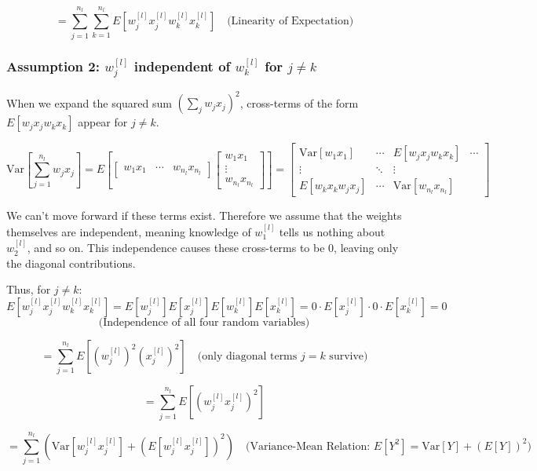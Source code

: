 \documentclass[
  letterpaper,
  DIV=11,
  numbers=noendperiod]{scrartcl}
\begin{document}
\[= \sum_{j=1}^{n_l}\sum_{k=1}^{n_l} E[w_j^{[l]} x_j^{[l]} w_k^{[l]} x_k^{[l]}] \quad \text{(Linearity of Expectation)}\]

\subsubsection{\texorpdfstring{Assumption 2: \(w_j^{[l]}\) independent
of \(w_k^{[l]}\) for
\(j \neq k\)}{Assumption 2: w\_j\^{}\{{[}l{]}\} independent of w\_k\^{}\{{[}l{]}\} for j \textbackslash neq k}}\label{assumption-2-w_jl-independent-of-w_kl-for-j-neq-k}

When we expand the squared sum \((\sum_j w_j x_j)^2\), cross-terms of
the form \(E[w_j x_j w_k x_k]\) appear for \(j \neq k\).

\[
\text{Var}\!\left[\sum_{j=1}^{n_l} w_j x_j \right]
= 
E\!\left[
\begin{bmatrix}
w_1 x_1 & \cdots & w_{n_l} x_{n_l}
\end{bmatrix}
\begin{bmatrix}
w_1 x_1 \\ \vdots \\ w_{n_l} x_{n_l}
\end{bmatrix}
\right]
=
\begin{bmatrix}
\text{Var}[w_1 x_1] & \cdots & E[w_j x_j w_k x_k] & \cdots \\
\vdots & \ddots & \vdots & \\
E[w_k x_k w_j x_j] & \cdots & \text{Var}[w_{n_l} x_{n_l}]
\end{bmatrix}
\]

We can't move forward if these terms exist. Therefore we assume that the
weights themselves are independent, meaning knowledge of \(w_1^{[l]}\)
tells us nothing about \(w_2^{[l]}\), and so on. This independence
causes these cross-terms to be 0, leaving only the diagonal
contributions.

Thus, for \(j \neq k\):
\[E[w_j^{[l]} x_j^{[l]} w_k^{[l]} x_k^{[l]}] = E[w_j^{[l]}]E[x_j^{[l]}]E[w_k^{[l]}]E[x_k^{[l]}] = 0 \cdot E[x_j^{[l]}] \cdot 0 \cdot E[x_k^{[l]}] = 0\]
\[\text{(Independence of all four random variables)}\]

\[= \sum_{j=1}^{n_l} E[(w_j^{[l]})^2 (x_j^{[l]})^2] \quad \text{(only diagonal terms } j = k \text{ survive)}\]

\[= \sum_{j=1}^{n_l} E[(w_j^{[l]} x_j^{[l]})^2]\]

\[= \sum_{j=1}^{n_l} \left(\text{Var}[w_j^{[l]} x_j^{[l]}] + (E[w_j^{[l]} x_j^{[l]}])^2\right) \quad \text{(Variance-Mean Relation: } E[Y^2] = \text{Var}[Y] + (E[Y])^2)\]
\end{document}
